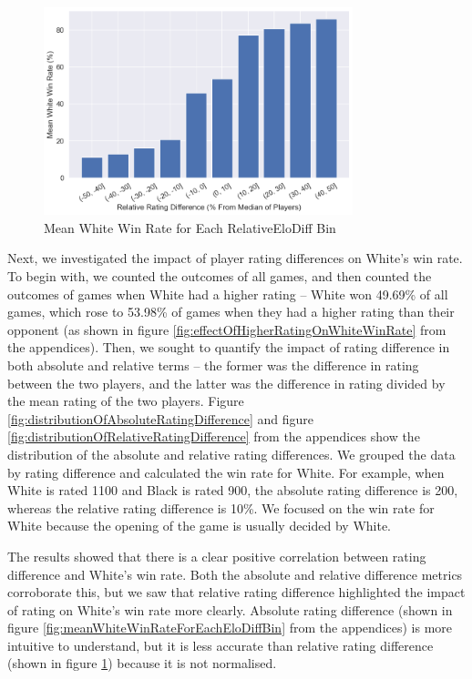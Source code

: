 \documentclass[a4paper, 11pt]{article}
\begin{document}
\begin{figure}[H]
    \centering
    \caption{Mean White Win Rate for Each RelativeEloDiff Bin}
    \label{fig:meanWhiteWinRateForEachRelativeEloDiffBin}
    \includegraphics[width=0.8\textwidth]{Mean White Win Rate for Each RelativeEloDiff Bin.png}
\end{figure}

Next, we investigated the impact of player rating differences on White's win rate. To begin with, we counted the outcomes of all games, and then counted the outcomes of games when White had a higher rating -- White won 49.69\% of all games, which rose to 53.98\% of games when they had a higher rating than their opponent (as shown in figure \ref{fig:effectOfHigherRatingOnWhiteWinRate} from the appendices). Then, we sought to quantify the impact of rating difference in both absolute and relative terms -- the former was the difference in rating between the two players, and the latter was the difference in rating divided by the mean rating of the two players. Figure \ref{fig:distributionOfAbsoluteRatingDifference} and figure \ref{fig:distributionOfRelativeRatingDifference} from the appendices show the distribution of the absolute and relative rating differences. We grouped the data by rating difference and calculated the win rate for White. For example, when White is rated 1100 and Black is rated 900, the absolute rating difference is 200, whereas the relative rating difference is 10\%. We focused on the win rate for White because the opening of the game is usually decided by White.

The results showed that there is a clear positive correlation between rating difference and White's win rate. Both the absolute and relative difference metrics corroborate this, but we saw that relative rating difference highlighted the impact of rating on White's win rate more clearly. Absolute rating difference (shown in figure \ref{fig:meanWhiteWinRateForEachEloDiffBin} from the appendices) is more intuitive to understand, but it is less accurate than relative rating difference (shown in figure \ref{fig:meanWhiteWinRateForEachRelativeEloDiffBin}) because it is not normalised.
\end{document}
